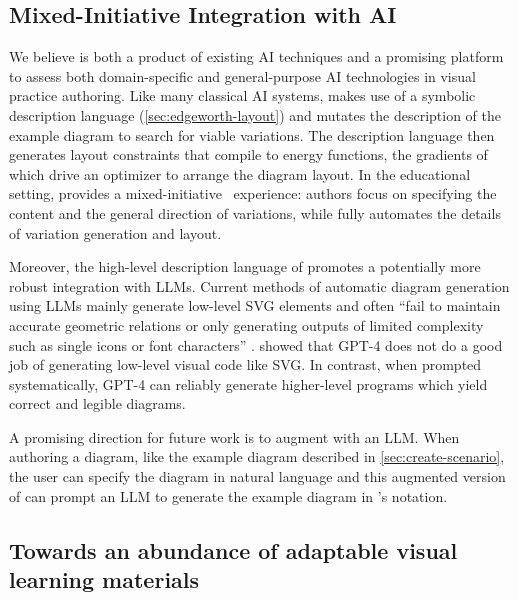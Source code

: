 \subsection{Mixed-Initiative Integration with AI}

We believe \Edgeworth is both a product of existing AI techniques and a promising platform to assess both domain-specific and general-purpose AI technologies in visual practice authoring. Like many classical AI systems, \Edgeworth makes use of a symbolic description language (\cref{sec:edgeworth-layout}) and mutates the description of the example diagram to search for viable variations. The description language then generates layout constraints that compile to energy functions, the gradients of which drive an optimizer to arrange the diagram layout. In the educational setting, \Edgeworth provides a mixed-initiative~\cite{allen1999mixedinitiative} experience: authors focus on specifying the content and the general direction of variations, while \Edgeworth fully automates the details of variation generation and layout. 

Moreover, the high-level description language of \Edgeworth promotes a potentially more robust integration with LLMs. Current methods of automatic diagram generation using LLMs mainly generate low-level SVG elements and often ``fail to maintain accurate geometric relations or only generating outputs of limited complexity such as single icons or font characters'' \cite{belouadi2024automatikz}. \citet{penrosellm} showed that GPT-4 does not do a good job of generating low-level visual code like SVG. In contrast, when prompted systematically, GPT-4 can reliably generate higher-level \Penrose programs which yield correct and legible diagrams.

A promising direction for future work is to augment \Edgeworth with an LLM. When authoring a diagram, like the example diagram described in \cref{sec:create-scenario}, the \Edgeworth user can specify the diagram in natural language and this augmented version of \Edgeworth can prompt an LLM to generate the example diagram in \Edgeworth's notation. 


\subsection{Towards an abundance of adaptable visual learning materials}

